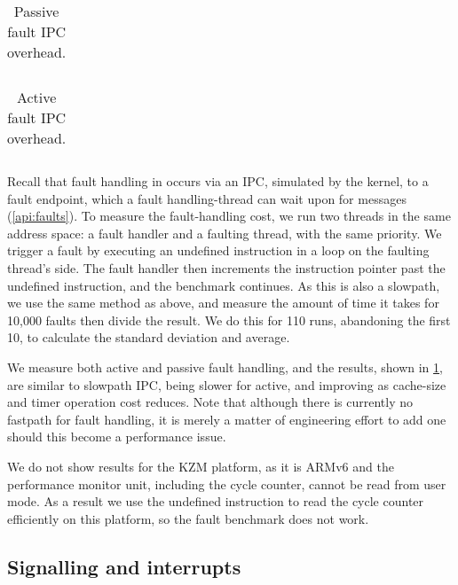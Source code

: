 \begin{table}[t]\centering
    \begin{tabularx}{\textwidth}{Xllllll}\toprule

    \bottomrule
\end{tabularx}
\caption{Passive fault IPC overhead.}
\label{t:slowpath-fault-micro}
\end{table}

\begin{table}[t]\centering
    \begin{tabularx}{\textwidth}{Xllllll}\toprule

    \bottomrule
\end{tabularx}
\caption{Active fault IPC overhead.}
\label{t:slowpath-fault-micro-passive}
\end{table}

Recall that fault handling in \selfour occurs via an \gls{IPC}, simulated by the kernel, to a fault
endpoint, which a fault handling-thread can wait upon for messages (\cref{api:faults}). 
To measure the fault-handling cost, we run two threads in the same address space: a fault handler
and a faulting thread, with the same priority. We trigger a fault by executing an undefined instruction in a loop on the faulting thread's
side. The fault handler then increments the instruction pointer past the undefined
instruction, and the benchmark continues.  As this is also a slowpath, we use the same method as
above, and measure the amount of time it takes for 10,000 faults then divide the result. We do this
for 110 runs, abandoning the first 10, to calculate the standard deviation and average. 

We measure both active and passive fault handling, and the results, shown in
\cref{t:slowpath-fault-micro}, are similar to slowpath
\gls{IPC}, being slower for active, and improving as cache-size and timer operation cost reduces. 
Note that although there is currently no fastpath for fault handling, it is merely a matter of
engineering effort to add one should this become a performance issue. 

We do not show results for the \textsc{KZM} platform, as it is ARMv6 and the performance monitor
unit, including the cycle counter, cannot be read from user mode. As a result we use the
undefined instruction to read the cycle counter efficiently on this platform, 
so the fault benchmark does not work.

\subsection{Signalling and interrupts}

